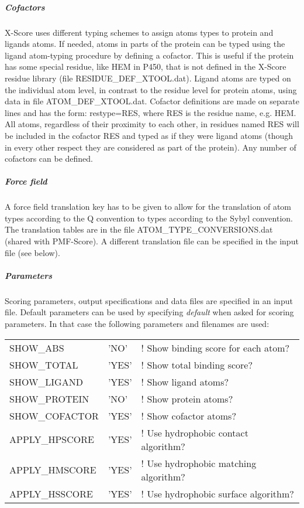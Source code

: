 \documentclass[a4paper,11pt]{article}
\begin{document}
\subparagraph{Cofactors}
X-Score uses  different typing  schemes to  assign atoms  types to
protein and  ligands atoms. If needed,  atoms in parts of  the protein
can  be typed  using the  ligand atom-typing  procedure by  defining a
cofactor. This is useful if the protein has some special residue, like
HEM in P450, that is not  defined in the X-Score residue library (file
RESIDUE\_DEF\_XTOOL.dat).  Ligand atoms  are typed  on the  individual
atom level, in contrast to the  residue level for protein atoms, using
data in  file ATOM\_DEF\_XTOOL.dat.  Cofactor definitions  are made on
separate lines and has the form: restype=RES, where RES is the residue
name,  e.g. HEM.  All atoms,  regardless  of their  proximity to  each
other, in residues named RES will  be included in the cofactor RES and
typed as if they were ligand atoms (though in every other respect they
are considered as part of the protein). Any number of cofactors can be
defined.

\subparagraph{Force field}
A  force field  translation  key has  to  be given  to  allow for  the
translation  of atom  types according  to  the Q  convention to  types
according to the  Sybyl convention. The translation tables  are in the
file ATOM\_TYPE\_CONVERSIONS.dat (shared  with PMF-Score). A different
translation file can be specified in the input file (see below).

\subparagraph{Parameters}
Scoring parameters, output specifications and data files are specified
in  an  input file.  Default  parameters  can  be used  by  specifying
\emph{default} when  asked for  scoring parameters.  In that  case the
following parameters and filenames are used:

    \begin{tabular}{lll}
    SHOW\_ABS      & 'NO'  &          ! Show binding score for each atom? \\
    SHOW\_TOTAL    & 'YES' &          ! Show total binding score? \\
    SHOW\_LIGAND   & 'YES' &          ! Show ligand atoms? \\
    SHOW\_PROTEIN  & 'NO'  &          ! Show protein atoms? \\
    SHOW\_COFACTOR & 'YES' &          ! Show cofactor atoms? \\

    APPLY\_HPSCORE & 'YES' &          ! Use hydrophobic contact algorithm? \\
    APPLY\_HMSCORE & 'YES' &          ! Use hydrophobic matching algorithm? \\
    APPLY\_HSSCORE & 'YES' &          ! Use hydrophobic surface algorithm? \\
    \end{tabular}
\end{document}
